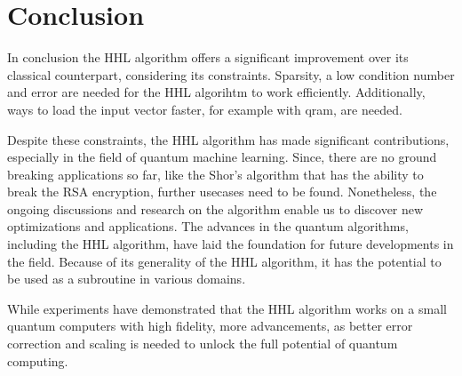 \section{Conclusion}

In conclusion the HHL algorithm offers a significant improvement over its classical counterpart, considering its constraints.
Sparsity, a low condition number and error are needed for the HHL algorihtm to work efficiently.
Additionally, ways to load the input vector faster, for example with qram, are needed. 

Despite these constraints, the HHL algorithm has made significant contributions, especially in the field of quantum machine learning. 
Since, there are no ground breaking applications so far, like the Shor's algorithm that has the ability to break the RSA encryption, further usecases need to be found.
Nonetheless, the ongoing discussions and research on the algorithm enable us to discover new optimizations and applications.
The advances in the quantum algorithms, including the HHL algorithm, have laid the foundation for future developments in the field.
Because of its generality of the HHL algorithm, it has the potential to be used as a subroutine in various domains.

While experiments have demonstrated that the HHL algorithm works on a small quantum computers with high fidelity, 
more advancements, as better error correction and scaling is needed to unlock the full potential of quantum computing.



